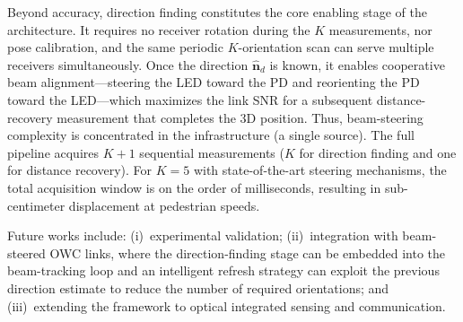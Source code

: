 \documentclass[journal]{IEEEtran}
\begin{document}
Beyond accuracy, direction finding constitutes the core enabling stage of the architecture. It requires no receiver rotation during the $K$ measurements, nor pose calibration, and the same periodic $K$-orientation scan can serve multiple receivers simultaneously. Once the direction $\hat{\mathbf{n}}_d$ is known, it enables cooperative beam alignment---steering the LED toward the PD and reorienting the PD toward the LED---which maximizes the link SNR for a subsequent distance-recovery measurement that completes the 3D position. Thus, beam-steering complexity is concentrated in the infrastructure (a single source). The full pipeline acquires $K+1$ sequential measurements ($K$ for direction finding and one for distance recovery). For $K=5$ with state-of-the-art steering mechanisms, the total acquisition window is on the order of milliseconds, resulting in sub-centimeter displacement at pedestrian speeds.

Future works include: (i)~experimental validation; (ii)~integration with beam-steered OWC links, where the direction-finding stage can be embedded into the beam-tracking loop and an intelligent refresh strategy can exploit the previous direction estimate to reduce the number of required orientations; and (iii)~extending the framework to optical integrated sensing and communication.


\appendices
\end{document}

